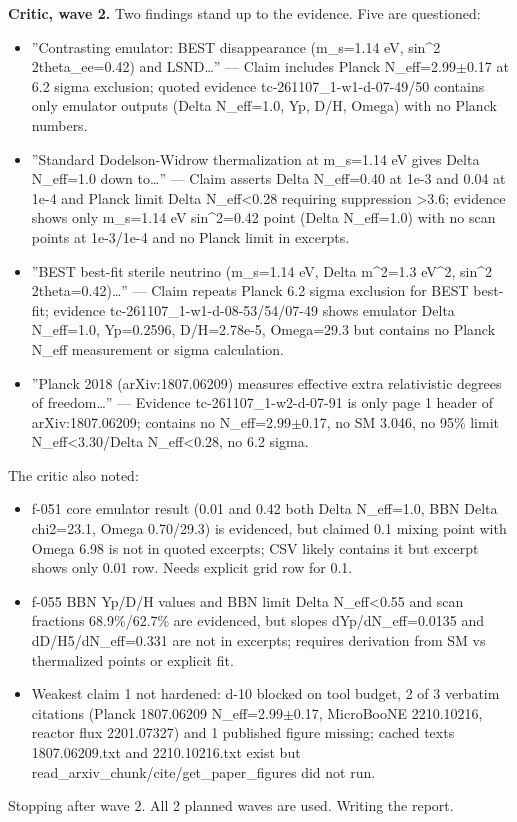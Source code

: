 \documentclass[11pt,a4paper]{article}
\begin{document}
\textbf{Critic, wave 2.} Two findings stand up to the evidence. Five are questioned:

\begin{itemize}
  \item ''Contrasting emulator: BEST disappearance (m\_s=1.14 eV, sin\textasciicircum{}2 2theta\_ee=0.42) and LSND\ldots{}'' --- Claim includes Planck N\_eff=2.99$\pm$0.17 at 6.2 sigma exclusion; quoted evidence tc-261107\_1-w1-d-07-49/50 contains only emulator outputs (Delta N\_eff=1.0, Yp, D/H, Omega) with no Planck numbers.
  \item ''Standard Dodelson-Widrow thermalization at m\_s=1.14 eV gives Delta N\_eff=1.0 down to\ldots{}'' --- Claim asserts Delta N\_eff=0.40 at 1e-3 and 0.04 at 1e-4 and Planck limit Delta N\_eff\textless{}0.28 requiring suppression \textgreater{}3.6; evidence shows only m\_s=1.14 eV sin\textasciicircum{}2=0.42 point (Delta N\_eff=1.0) with no scan points at 1e-3/1e-4 and no Planck limit in excerpts.
  \item ''BEST best-fit sterile neutrino (m\_s=1.14 eV, Delta m\textasciicircum{}2=1.3 eV\textasciicircum{}2, sin\textasciicircum{}2 2theta=0.42)\ldots{}'' --- Claim repeats Planck 6.2 sigma exclusion for BEST best-fit; evidence tc-261107\_1-w1-d-08-53/54/07-49 shows emulator Delta N\_eff=1.0, Yp=0.2596, D/H=2.78e-5, Omega=29.3 but contains no Planck N\_eff measurement or sigma calculation.
  \item ''Planck 2018 (arXiv:1807.06209) measures effective extra relativistic degrees of freedom\ldots{}'' --- Evidence tc-261107\_1-w2-d-07-91 is only page 1 header of arXiv:1807.06209; contains no N\_eff=2.99$\pm$0.17, no SM 3.046, no 95\% limit N\_eff\textless{}3.30/Delta N\_eff\textless{}0.28, no 6.2 sigma.
\end{itemize}
The critic also noted:

\begin{itemize}
  \item f-051 core emulator result (0.01 and 0.42 both Delta N\_eff=1.0, BBN Delta chi2=23.1, Omega 0.70/29.3) is evidenced, but claimed 0.1 mixing point with Omega 6.98 is not in quoted excerpts; CSV likely contains it but excerpt shows only 0.01 row. Needs explicit grid row for 0.1.
  \item f-055 BBN Yp/D/H values and BBN limit Delta N\_eff\textless{}0.55 and scan fractions 68.9\%/62.7\% are evidenced, but slopes dYp/dN\_eff=0.0135 and dD/H5/dN\_eff=0.331 are not in excerpts; requires derivation from SM vs thermalized points or explicit fit.
  \item Weakest claim 1 not hardened: d-10 blocked on tool budget, 2 of 3 verbatim citations (Planck 1807.06209 N\_eff=2.99$\pm$0.17, MicroBooNE 2210.10216, reactor flux 2201.07327) and 1 published figure missing; cached texts 1807.06209.txt and 2210.10216.txt exist but read\_arxiv\_chunk/cite/get\_paper\_figures did not run.
\end{itemize}
Stopping after wave 2. All 2 planned waves are used. Writing the report.
\end{document}
